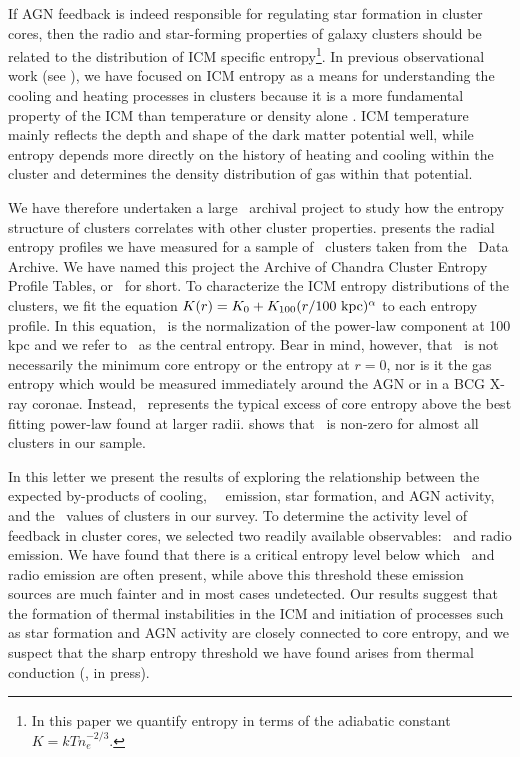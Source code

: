 \documentclass{emulateapj}
\begin{document}
If AGN feedback is indeed responsible for regulating star formation in
cluster cores, then the radio and star-forming properties of galaxy
clusters should be related to the distribution of ICM specific
entropy\footnote{In this paper we quantify entropy in terms of the
  adiabatic constant $K = kTn_e^{-2/3}$.}. In previous observational
work (see \citealt{radioquiet, d06, accept}), we have focused on ICM
entropy as a means for understanding the cooling and heating processes
in clusters because it is a more fundamental property of the ICM than
temperature or density alone \citep{voitbryan,voitreview}. ICM
temperature mainly reflects the depth and shape of the dark matter
potential well, while entropy depends more directly on the history of
heating and cooling within the cluster and determines the density
distribution of gas within that potential.

We have therefore undertaken a large \Chandra\ archival project to
study how the entropy structure of clusters correlates with other
cluster properties. \cite{accept} presents the radial entropy profiles
we have measured for a sample of \clnum\ clusters taken from the
\Chandra\ Data Archive. We have named this project the Archive of
Chandra Cluster Entropy Profile Tables, or \accept\ for short. To
characterize the ICM entropy distributions of the clusters, we fit the
equation $K(r) = K_0 +K_{100}(r/100 \mbox{\ensuremath{\mathrm{~kpc}}})^{\alpha}$ to each entropy
profile. In this equation, \khun\ is the normalization of the
power-law component at 100 kpc and we refer to \kna\ as the central
entropy. Bear in mind, however, that \kna\ is not necessarily the
minimum core entropy or the entropy at $r=0$, nor is it the gas
entropy which would be measured immediately around the AGN or in a BCG
X-ray coronae. Instead, \kna\ represents the typical excess of core
entropy above the best fitting power-law found at larger
radii. \cite{accept} shows that \kna\ is non-zero for almost all
clusters in our sample.

In this letter we present the results of exploring the relationship
between the expected by-products of cooling, \eg\ \halpha\ emission,
star formation, and AGN activity, and the \kna\ values of clusters in
our survey. To determine the activity level of feedback in cluster
cores, we selected two readily available observables: \halpha\ and
radio emission. We have found that there is a critical entropy level
below which \halpha\ and radio emission are often present, while above
this threshold these emission sources are much fainter and in most
cases undetected. Our results suggest that the formation of thermal
instabilities in the ICM and initiation of processes such as star
formation and AGN activity are closely connected to core entropy, and
we suspect that the sharp entropy threshold we have found arises from
thermal conduction (\citealt{conduction}, in press).
\end{document}
